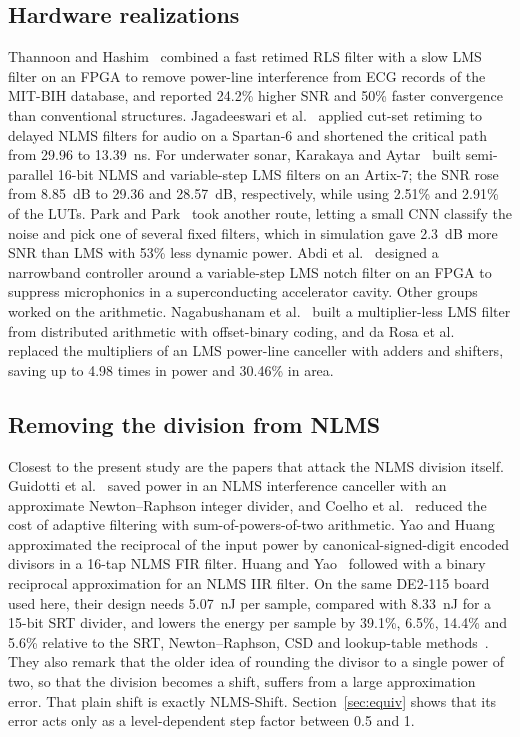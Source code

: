 \subsection{Hardware realizations}
Thannoon and Hashim~\cite{thannoon2024} combined a fast retimed RLS filter with a slow LMS filter on an
FPGA to remove power-line interference from ECG records of the MIT-BIH database, and reported 24.2\%
higher SNR and 50\% faster convergence than conventional structures. Jagadeeswari et
al.~\cite{jagadeeswari2026} applied cut-set retiming to delayed NLMS filters for audio on a Spartan-6 and
shortened the critical path from 29.96 to 13.39~ns. For underwater sonar, Karakaya and
Aytar~\cite{karakaya2026} built semi-parallel 16-bit NLMS and variable-step LMS filters on an Artix-7;
the SNR rose from 8.85~dB to 29.36 and 28.57~dB, respectively, while using 2.51\% and 2.91\% of the LUTs.
Park and Park~\cite{park2023} took another route, letting a small CNN classify the noise and pick one of
several fixed filters, which in simulation gave 2.3~dB more SNR than LMS with 53\% less dynamic power.
Abdi et al.~\cite{abdi2024} designed a narrowband controller around a variable-step LMS notch filter on an
FPGA to suppress microphonics in a superconducting accelerator cavity. Other groups worked on the
arithmetic. Nagabushanam et al.~\cite{nagabushanam2025} built a multiplier-less LMS filter from
distributed arithmetic with offset-binary coding, and da Rosa et al.~\cite{rosa2022} replaced the
multipliers of an LMS power-line canceller with adders and shifters, saving up to 4.98 times in power and
30.46\% in area.

\subsection{Removing the division from NLMS}
Closest to the present study are the papers that attack the NLMS division itself. Guidotti et
al.~\cite{guidotti2020} saved power in an NLMS interference canceller with an approximate Newton--Raphson
integer divider, and Coelho et al.~\cite{coelho2022} reduced the cost of adaptive filtering with
sum-of-powers-of-two arithmetic. Yao and Huang~\cite{yao2024} approximated the reciprocal of the input
power by canonical-signed-digit encoded divisors in a 16-tap NLMS FIR filter. Huang and
Yao~\cite{huang2026} followed with a binary reciprocal approximation for an NLMS IIR filter. On the same
DE2-115 board used here, their design needs 5.07~nJ per sample, compared with 8.33~nJ for a 15-bit SRT
divider, and lowers the energy per sample by 39.1\%, 6.5\%, 14.4\% and 5.6\% relative to the SRT,
Newton--Raphson, CSD and lookup-table methods~\cite{huang2026}. They also remark that the older idea of
rounding the divisor to a single power of two, so that the division becomes a shift, suffers from a large
approximation error. That plain shift is exactly NLMS-Shift. Section~\ref{sec:equiv} shows that its error
acts only as a level-dependent step factor between 0.5 and 1.

